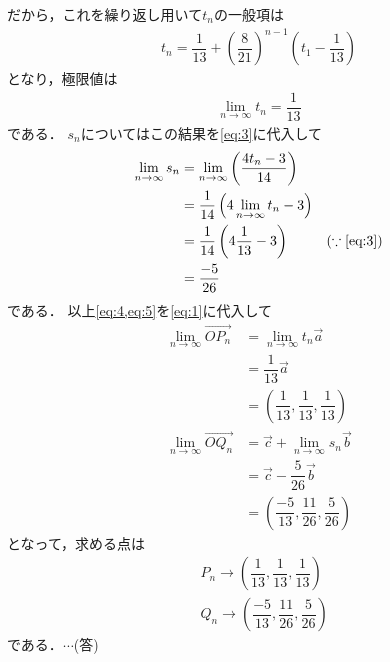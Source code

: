 \documentclass[../../main.tex]{subfiles}
\begin{document}
だから，これを繰り返し用いて$t_n$の一般項は
\begin{align}
  t_n=\dfrac{1}{13}+\left(\dfrac{8}{21}\right)^{n-1}\left(t_1-\dfrac{1}{13}\right)
\end{align}
となり，極限値は
\begin{align}
  \lim_{n\to\infty}t_n = \dfrac{1}{13}\label{eq:4}
\end{align}
である．
$s_n$についてはこの結果を\cref{eq:3}に代入して
\begin{align}
  \lim_{n\to\infty}s_n
  &=\lim_{n\to\infty}\left(\dfrac{4t_n-3}{14}\right)\nonumber \\
  &=\dfrac{1}{14}\left(4\lim_{n\to\infty}t_n-3\right)\nonumber\\
  &=\dfrac{1}{14}\left(4\dfrac{1}{13}-3\right)&(\because\text{\cref{eq:3}})\nonumber \\
  &=\dfrac{-5}{26}\label{eq:5}
\end{align}
である．
以上\cref{eq:4,eq:5}を\cref{eq:1}に代入して
\begin{align}
  \lim_{n\to\infty}\overrightarrow{OP_n}
  &=\lim_{n\to\infty} t_n\vec{a}\\
  &=\dfrac{1}{13}\vec{a} \\
  &=\left(\dfrac{1}{13},\dfrac{1}{13},\dfrac{1}{13}\right) \\
  \lim_{n\to\infty}\overrightarrow{OQ_n}
  &=\vec{c}+\lim_{n\to\infty}s_n\vec{b}\\
  &=\vec{c}-\dfrac{5}{26}\vec{b} \\
  &=\left(\dfrac{-5}{13},\dfrac{11}{26},\dfrac{5}{26}\right)
\end{align}
となって，求める点は
\begin{align}
  &P_n\to\left(\dfrac{1}{13},\dfrac{1}{13},\dfrac{1}{13}\right) \\
  &Q_n\to\left(\dfrac{-5}{13},\dfrac{11}{26},\dfrac{5}{26}\right)
\end{align}
である．$\cdots$(答)
\newpage
\end{document}
